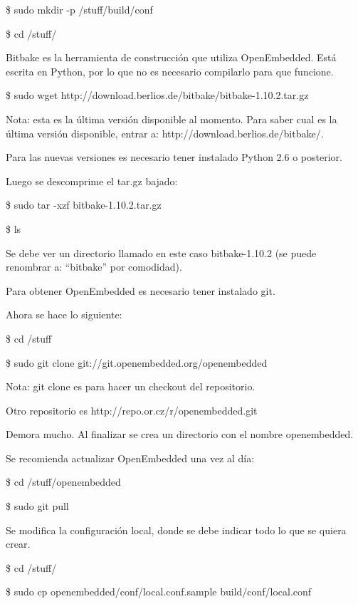 \bigskip
\centerline{\$ sudo mkdir -p /stuff/build/conf}

\centerline{\$ cd /stuff/}

\bigskip
Bitbake es la herramienta de construcción que utiliza OpenEmbedded. Está escrita en Python, por lo que no es necesario compilarlo para que funcione.

\bigskip
\centerline{\$ sudo wget http://download.berlios.de/bitbake/bitbake-1.10.2.tar.gz}

\bigskip
Nota: esta es la última versión disponible al momento. Para saber cual es la última versión disponible, entrar a: http://download.berlios.de/bitbake/.

Para las nuevas versiones es necesario tener instalado Python 2.6 o posterior.

\bigskip
Luego se descomprime el tar.gz bajado:

\bigskip
\centerline{\$ sudo tar -xzf bitbake-1.10.2.tar.gz}

\centerline{\$ ls}

\bigskip
Se debe ver un directorio llamado en este caso bitbake-1.10.2 (se puede renombrar a: “bitbake” por comodidad).

\bigskip
Para obtener OpenEmbedded es necesario tener instalado git.

\bigskip
Ahora se hace lo siguiente:

\bigskip
\centerline{\$ cd /stuff}

\centerline{\$ sudo git clone git://git.openembedded.org/openembedded}

\bigskip
Nota: git clone es para hacer un checkout del repositorio. 

Otro repositorio es http://repo.or.cz/r/openembedded.git

\bigskip
Demora mucho. Al finalizar se crea un directorio con el nombre openembedded.

\bigskip
Se recomienda actualizar OpenEmbedded una vez al día:

\bigskip
\centerline{\$ cd /stuff/openembedded}

\centerline{\$ sudo git pull}

\newpage
{}

\bigskip
Se modifica la configuración local, donde se debe indicar todo lo que se quiera crear.

\bigskip
\centerline{\$ cd /stuff/}

\centerline{\$ sudo cp openembedded/conf/local.conf.sample build/conf/local.conf}

